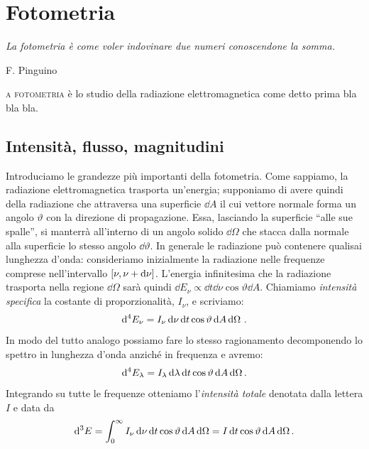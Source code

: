 \chapter{Fotometria}\label{ch:fotometria}
\epigraph{\itshape La fotometria è come voler indovinare due numeri conoscendone la somma.}{F. Pinguino}
\noindent{}\textsc{a fotometria} è lo studio della radiazione elettromagnetica come detto prima bla bla bla. \lipsum[1]
\section{Intensità, flusso, magnitudini}
    Introduciamo le grandezze più importanti della fotometria. Come sappiamo, la radiazione elettromagnetica trasporta un'energia; supponiamo di avere quindi della radiazione che attraversa una superficie $\dd A$ il cui vettore normale forma un angolo $\vartheta$ con la direzione di propagazione. Essa, lasciando la superficie ``alle sue spalle'', si manterrà all'interno di un angolo solido $\dd\Omega$ che stacca dalla normale alla superficie lo stesso angolo $\dd\vartheta$. In generale le radiazione può contenere qualisai lunghezza d'onda: consideriamo inizialmente la radiazione nelle frequenze comprese nell'intervallo  $\bqty{\nu,\nu + \dd\nu}$. L'energia infinitesima che la radiazione trasporta nella regione $\dd\Omega$ sarà quindi $\dd E_\nu \propto \dd t \dd\nu \cos\vartheta\dd A$. Chiamiamo \emph{intensità specifica} la costante di proporzionalità, $I_\nu$, e scriviamo:
    \begin{equation}
        \label{intensità-specifica-freq}
        \dd[4] E_\nu = I_{\nu} \dd{\nu} \dd{t} \cos{\vartheta} \dd{A} \dd{\Omega}
        \,.
    \end{equation}
    In modo del tutto analogo possiamo fare lo stesso ragionamento decomponendo lo spettro in lunghezza d'onda anziché in frequenza e avremo:
    \begin{equation}
        \label{intensità-specifica-lambda}
        \dd[4] E_\lambda = I_\lambda \,\dd\lambda\,\dd t\cos\vartheta\,\dd A \,\dd\Omega
        \,.
    \end{equation}
    Integrando su tutte le frequenze otteniamo l'\emph{intensità totale} denotata dalla lettera $I$ e data da
    \begin{equation*}
        \label{intensità-totale}
        \dd[3] E = \int_{0}^{\infty}I_\nu \,\dd\nu\,\dd t\cos\vartheta\,\dd A \,\dd\Omega = I \,\dd t\cos\vartheta\,\dd A \,\dd\Omega
        \,.
    \end{equation*}
